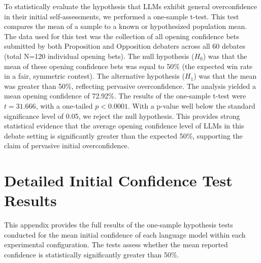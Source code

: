 \documentclass{article}
\begin{document}
To statistically evaluate the hypothesis that LLMs exhibit general overconfidence in their initial self-assessments, we performed a one-sample t-test. This test compares the mean of a sample to a known or hypothesized population mean. The data used for this test was the collection of all opening confidence bets submitted by both Proposition and Opposition debaters across all 60 debates (total N=120 individual opening bets). The null hypothesis ($H_0$) was that the mean of these opening confidence bets was equal to 50\% (the expected win rate in a fair, symmetric contest). The alternative hypothesis ($H_1$) was that the mean was greater than 50\%, reflecting pervasive overconfidence. The analysis yielded a mean opening confidence of 72.92\%. The results of the one-sample t-test were $t = 31.666$, with a one-tailed $p < 0.0001$. With a p-value well below the standard significance level of 0.05, we reject the null hypothesis. This provides strong statistical evidence that the average opening confidence level of LLMs in this debate setting is significantly greater than the expected 50\%, supporting the claim of pervasive initial overconfidence.


\section{Detailed Initial Confidence Test Results}
\label{appendix:initial_tests}

This appendix provides the full results of the one-sample hypothesis tests conducted for the mean initial confidence of each language model within each experimental configuration. The tests assess whether the mean reported confidence is statistically significantly greater than 50\%.
\end{document}
